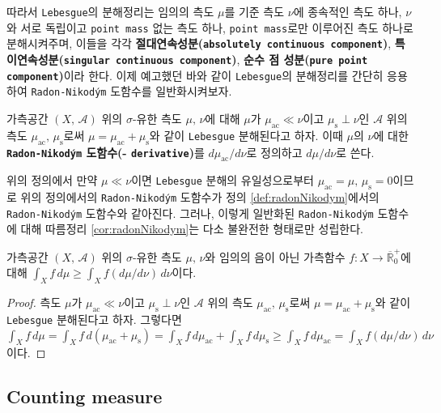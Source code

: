 따라서 \texttt{Lebesgue}의 분해정리는 임의의 측도 $\mu$를 기준 측도 $\nu$에 종속적인 측도 하나, $\nu$와 서로 독립이고 \texttt{point mass} 없는 측도 하나, \texttt{point mass}로만 이루어진 측도 하나로 분해시켜주며, 이들을 각각 \textbf{절대연속성분(\texttt{absolutely continuous component})}, \textbf{특이연속성분(\texttt{singular continuous component})}, \textbf{순수 점 성분(\texttt{pure point component})}이라 한다. 이제 예고했던 바와 같이 \texttt{Lebesgue}의 분해정리를 간단히 응용하여 \texttt{Radon-Nikod\'ym} 도함수를 일반화시켜보자.

\begin{definition}
    가측공간 $(X,\,\mathcal{A})$ 위의 $\sigma$-유한 측도 $\mu,\,\nu$에 대해 $\mu$가 $\mu_\mathrm{ac}\ll\nu$이고 $\mu_\mathrm{s}\perp\nu$인 $\mathcal{A}$ 위의 측도 $\mu_\mathrm{ac},\,\mu_\mathrm{s}$로써 $\mu=\mu_\mathrm{ac}+\mu_\mathrm{s}$와 같이 \texttt{Lebesgue} 분해된다고 하자. 이때 $\mu$의 $\nu$에 대한 \textbf{\texttt{Radon-Nikod\'ym} 도함수(- \texttt{derivative})}를 $d\mu_\mathrm{ac}/d\nu$로 정의하고 $d\mu/d\nu$로 쓴다.
\end{definition}

위의 정의에서 만약 $\mu\ll\nu$이면 \texttt{Lebesgue} 분해의 유일성으로부터  $\mu_\mathrm{ac}=\mu,\,\mu_\mathrm{s}=0$이므로 위의 정의에서의 \texttt{Radon-Nikod\'ym} 도함수가 정의 \ref{def:radonNikodym}에서의 \texttt{Radon-Nikod\'ym} 도함수와 같아진다. 그러나, 이렇게 일반화된 \texttt{Radon-Nikod\'ym} 도함수에 대해 따름정리 \ref{cor:radonNikodym}는 다소 불완전한 형태로만 성립한다.

\begin{corollary}
    가측공간 $(X,\,\mathcal{A})$ 위의 $\sigma$-유한 측도 $\mu,\,\nu$와 임의의 음이 아닌 가측함수 $f:X\to\overline{\mathbb{R}}^+_0$에 대해 $\int_Xf\,d\mu\geq\int_Xf(d\mu/d\nu)\,d\nu$이다.
\end{corollary}

\begin{proof}
    측도 $\mu$가 $\mu_\mathrm{ac}\ll\nu$이고 $\mu_\mathrm{s}\perp\nu$인 $\mathcal{A}$ 위의 측도 $\mu_\mathrm{ac},\,\mu_\mathrm{s}$로써 $\mu=\mu_\mathrm{ac}+\mu_\mathrm{s}$와 같이 \texttt{Lebesgue} 분해된다고 하자. 그렇다면 $\int_Xf\,d\mu=\int_Xf\,d(\mu_\mathrm{ac}+\mu_\mathrm{s})=\int_Xf\,d\mu_\mathrm{ac}+\int_Xf\,d\mu_\mathrm{s}\geq\int_Xf\,d\mu_\mathrm{ac}=\int_Xf(d\mu/d\nu)\,d\nu$이다.
\end{proof}

\subsection{Counting measure}


